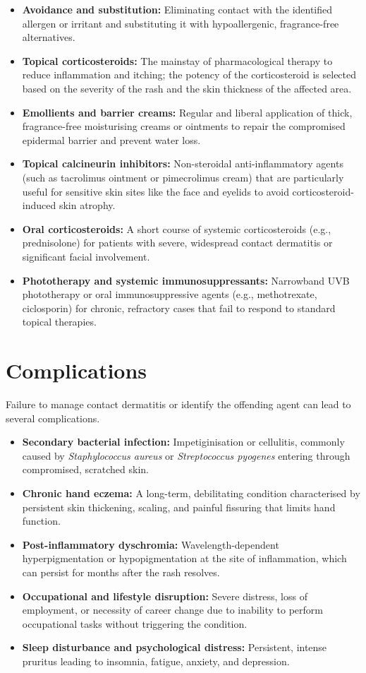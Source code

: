 \begin{itemize}
    \item \textbf{Avoidance and substitution:} Eliminating contact with the identified allergen or irritant and substituting it with hypoallergenic, fragrance-free alternatives.
    \item \textbf{Topical corticosteroids:} The mainstay of pharmacological therapy to reduce inflammation and itching; the potency of the corticosteroid is selected based on the severity of the rash and the skin thickness of the affected area.
    \item \textbf{Emollients and barrier creams:} Regular and liberal application of thick, fragrance-free moisturising creams or ointments to repair the compromised epidermal barrier and prevent water loss.
    \item \textbf{Topical calcineurin inhibitors:} Non-steroidal anti-inflammatory agents (such as tacrolimus ointment or pimecrolimus cream) that are particularly useful for sensitive skin sites like the face and eyelids to avoid corticosteroid-induced skin atrophy.
    \item \textbf{Oral corticosteroids:} A short course of systemic corticosteroids (e.g., prednisolone) for patients with severe, widespread contact dermatitis or significant facial involvement.
    \item \textbf{Phototherapy and systemic immunosuppressants:} Narrowband UVB phototherapy or oral immunosuppressive agents (e.g., methotrexate, ciclosporin) for chronic, refractory cases that fail to respond to standard topical therapies.
\end{itemize}

\section*{Complications}
Failure to manage contact dermatitis or identify the offending agent can lead to several complications.

\begin{itemize}
    \item \textbf{Secondary bacterial infection:} Impetiginisation or cellulitis, commonly caused by \textit{Staphylococcus aureus} or \textit{Streptococcus pyogenes} entering through compromised, scratched skin.
    \item \textbf{Chronic hand eczema:} A long-term, debilitating condition characterised by persistent skin thickening, scaling, and painful fissuring that limits hand function.
    \item \textbf{Post-inflammatory dyschromia:} Wavelength-dependent hyperpigmentation or hypopigmentation at the site of inflammation, which can persist for months after the rash resolves.
    \item \textbf{Occupational and lifestyle disruption:} Severe distress, loss of employment, or necessity of career change due to inability to perform occupational tasks without triggering the condition.
    \item \textbf{Sleep disturbance and psychological distress:} Persistent, intense pruritus leading to insomnia, fatigue, anxiety, and depression.
\end{itemize}

